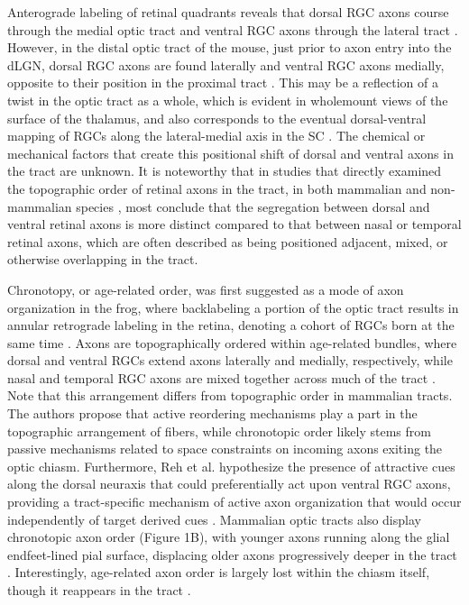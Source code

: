 Anterograde labeling of retinal quadrants reveals that dorsal RGC axons course through the medial optic tract and ventral RGC axons through the lateral tract \cite{chan1999changes,chan1994changes,plas2005pretarget,reese1993reestablishment,reese1990fibre,reh1983organization}.
However, in the distal optic tract of the mouse, just prior to axon entry into the dLGN, dorsal RGC axons are found laterally and ventral RGC axons medially, opposite to their position in the proximal tract \cite{plas2005pretarget}. %
This may be a reflection of a twist in the optic tract as a whole, which is evident in wholemount views of the surface of the thalamus, and also corresponds to the eventual dorsal-ventral mapping of RGCs along the lateral-medial axis in the SC \cite{plas2005pretarget}.
The chemical or mechanical factors that create this positional shift of dorsal and ventral axons in the tract are unknown.
It is noteworthy that in studies that directly examined the topographic order of retinal axons in the tract, in both mammalian \cite{chan1994changes,plas2005pretarget,reese1993reestablishment} and non-mammalian species \cite{ehrlich1984course,montgomery1998organization,reh1983organization,thanos1983investigations}, most conclude that the segregation between dorsal and ventral retinal axons is more distinct compared to that between nasal or temporal retinal axons, which are often described as being positioned adjacent, mixed, or otherwise overlapping in the tract.

Chronotopy, or age-related order, was first suggested as a mode of axon organization in the frog, where backlabeling a portion of the optic tract results in annular retrograde labeling in the retina, denoting a cohort of RGCs born at the same time \cite{fawcett1984fibre,reh1983organization}.
Axons are topographically ordered within age-related bundles, where dorsal and ventral RGCs extend axons laterally and medially, respectively, while nasal and temporal RGC axons are mixed together across much of the tract \cite{reh1983organization}.
Note that this arrangement differs from topographic order in mammalian tracts.
The authors propose that active reordering mechanisms play a part in the topographic arrangement of fibers, while chronotopic order likely stems from passive mechanisms related to space constraints on incoming axons exiting the optic chiasm.
Furthermore, Reh et al. hypothesize the presence of attractive cues along the dorsal neuraxis that could preferentially act upon ventral RGC axons, providing a tract-specific mechanism of active axon organization that would occur independently of target derived cues \cite{reh1983organization}.
Mammalian optic tracts also display chronotopic axon order (Figure 1B), with younger axons running along the glial endfeet-lined pial surface, displacing older axons progressively deeper in the tract \cite{colello1992observations,reese1987distributionrat,reese1990fibre,reese1997chronotopic,walsh1985age}. %
Interestingly, age-related axon order is largely lost within the chiasm itself, though it reappears in the tract \cite{colello1998changing}.

